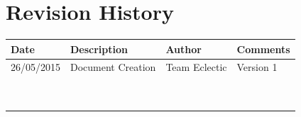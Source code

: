 \documentclass[11pt]{article}
\begin{document}


\setcounter{tocdepth}{3}
\tableofcontents

\newpage
\section{Revision History}
\begin{table}[h]
\begin{tabular}{llll}
\textbf{Date}          & \textbf{Description}  & \textbf{Author}       & \textbf{Comments}   \\ \hline
\multicolumn{1}{|R{2.5cm}|}{26/05/2015} & \multicolumn{1}{L{5.5cm}|}{Document Creation} & \multicolumn{1}{l|}{Team Eclectic} & \multicolumn{1}{L{4cm}|}{Version 1} \\ \hline
\multicolumn{1}{|l|}{} & \multicolumn{1}{l|}{} & \multicolumn{1}{l|}{} & \multicolumn{1}{l|}{} \\ \hline
\multicolumn{1}{|l|}{} & \multicolumn{1}{l|}{} & \multicolumn{1}{l|}{} & \multicolumn{1}{l|}{} \\ \hline
\multicolumn{1}{|l|}{} & \multicolumn{1}{l|}{} & \multicolumn{1}{l|}{} & \multicolumn{1}{l|}{} \\ \hline
\multicolumn{1}{|l|}{} & \multicolumn{1}{l|}{} & \multicolumn{1}{l|}{} & \multicolumn{1}{l|}{} \\ \hline
\multicolumn{1}{|l|}{} & \multicolumn{1}{l|}{} & \multicolumn{1}{l|}{} & \multicolumn{1}{l|}{} \\ \hline
\multicolumn{1}{|l|}{} & \multicolumn{1}{l|}{} & \multicolumn{1}{l|}{} & \multicolumn{1}{l|}{} \\ \hline
\multicolumn{1}{|l|}{} & \multicolumn{1}{l|}{} & \multicolumn{1}{l|}{} & \multicolumn{1}{l|}{} \\ \hline
\multicolumn{1}{|l|}{} & \multicolumn{1}{l|}{} & \multicolumn{1}{l|}{} & \multicolumn{1}{l|}{} \\ \hline
\multicolumn{1}{|l|}{} & \multicolumn{1}{l|}{} & \multicolumn{1}{l|}{} & \multicolumn{1}{l|}{} \\ \hline
\end{tabular}
\end{table}
\end{document}
